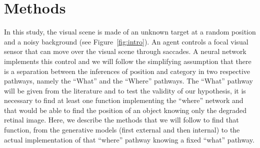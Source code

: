 \section{Methods}
\label{sec:methods}
In this study, the visual scene is made of an unknown target at a random position and a noisy background (see Figure~\ref{fig:intro}). An agent controls a focal visual sensor that can move over the visual scene through saccades. A neural network implements this control and we will follow the simplifying assumption that there is a separation between the inferences of  position and category in two respective pathways, namely the ``What'' and the ``Where'' pathways. The ``What'' pathway will be given from the literature and to test the validity of our hypothesis, it is necessary to find at least one function implementing the ``where'' network and that would be able to find the position of an object knowing only the degraded retinal image. Here, we describe the methods that we will follow to find that function, from the generative models (first external and then internal) to the actual implementation of that ``where'' pathway knowing a fixed ``what'' pathway. %
